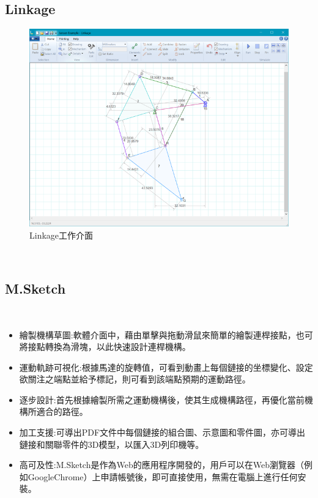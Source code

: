 \documentclass[14pt,a4paper]{report}  %
\newcommand{\fourteen}{\fontsize{14pt}{\baselineskip}\selectfont}%
\begin{document}
       	\subsection{Linkage}
      \quad \fourteen {Linkage為電腦輔助設計的應用程式，用於機械鏈接的原型製作。基本功能為設計帶有樞軸連接器或滑動連接器之機構、驅動機構的輸入可以是旋轉或線性的、可在運動的連桿上安裝齒輪和鏈條機構、將繪圖功能分配給連接點顯示其運動之軌跡。}
 		\begin{figure}[H]
        \centering
        \includegraphics[scale=1]{Linkage.png} 
        \caption{Linkage工作介面} 
        \label{fig:scale}
    	\end{figure}
	  	\hspace*{\fill} \\
\newpage
	  	\subsection{M.Sketch}
       	\hspace*{\fill} \\        
       \fourteen {M.Sketch，一種原型設計工具，設計目的在為非專業人士提供簡單直觀的界面，輕鬆學習與使用幾何圖形的模擬，如圖2.2。其中有五個主要功能:}
       \begin{itemize} 
       \item 繪製機構草圖:軟體介面中，藉由單擊與拖動滑鼠來簡單的繪製連桿接點，也可將接點轉換為滑塊，以此快速設計連桿機構。
       \item 運動軌跡可視化:根據馬達的旋轉值，可看到動畫上每個鏈接的坐標變化、設定欲關注之端點並給予標記，則可看到該端點預期的運動路徑。
       \item 逐步設計:首先根據繪製所需之運動機構後，使其生成機構路徑，再優化當前機構所適合的路徑。
       \item 加工支援:可導出PDF文件中每個鏈接的組合圖、示意圖和零件圖，亦可導出鏈接和關聯零件的3D模型，以匯入3D列印機等。
       \item 高可及性:M.Sketch是作為Web的應用程序開發的，用戶可以在Web瀏覽器（例如GoogleChrome）上申請帳號後，即可直接使用，無需在電腦上進行任何安裝。
\end{itemize}  
       
\end{document}
